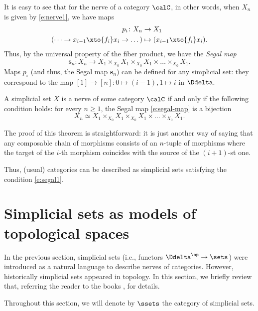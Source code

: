 It is easy to see that for the nerve of a category $\calC$, in other words,
when $X_n$ is given by \eqref{e:nerve1}, we have maps
\begin{align*}
p_i \colon X_n&\to X_1\\
(\dots \to x_{i-1} \xto{f_i} x_i\to \dots )&\mapsto ( x_{i-1} \xto{f_i} x_i).
\end{align*}
Thus, by the universal property of the fiber product, we have the
\emph{Segal map}
\begin{equation}\label{e:segal-map}
   \mathbf{s}_n\colon X_n \to
   X_1\times_{X_0} X_1\times_{X_0} X_1 \times\dots \times_{X_0} X_1.
\end{equation}
Maps $p_i$ (and thus, the Segal map $\mathbf{s}_n$) can be defined for any
simplicial set: they correspond to the map $[1]\to[n]\colon 0\mapsto (i-1),
1\mapsto i$ in $\Ddelta$.

\begin{theorem}\label{t:segal1}
  A simplicial set $X$ is a nerve of some category $\calC$ if and only if the
  following condition holds: for every $n\ge
  1$, the Segal map \eqref{e:segal-map} is a bijection
  \begin{equation}\label{e:segal1}
    X_n \simeq X_1\times_{X_0} X_1\times_{X_0} X_1 \times\dots \times_{X_0} X_1.
  \end{equation}
\end{theorem}
The proof of this theorem is straightforward:
it is just another way of saying that any
composable chain of morphisms consists of an $n$-tuple of morphisms where the
target of the $i$-th morphism coincides with the source of the $(i+1)$-st one.


Thus, (usual) categories can be described as simplicial sets satisfying the
condition \eqref{e:segal1}.

\section{Simplicial sets as models of topological spaces}\label{s:sset}

In the previous section, simplicial sets (i.e., functors $\Ddelta^\op\to \sets$)
were introduced as a natural language to describe nerves of categories. However,
historically simplicial sets appeared in topology. In this section, we briefly
review that, referring the reader to the books ,
 for details.

Throughout this section, we will denote by $\ssets$ the category of simplicial
sets.

